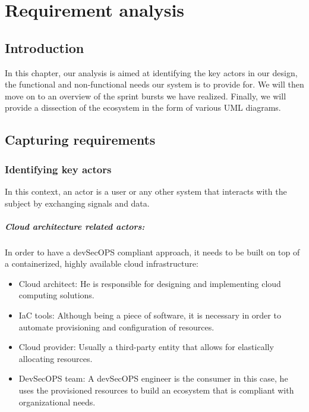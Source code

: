 \graphicspath{{./assets/}}
\setcounter{mtc}{2}
\chapter{Requirement analysis  }
\minitoc
\newpage

\section*{Introduction}
In this chapter, our analysis is aimed at identifying the key actors in our design, the functional and non-functional needs our system is to provide for. We will then move on to an overview of the sprint bursts we have realized. Finally, we will provide a dissection of the ecosystem in the form of various UML diagrams. 

\section{Capturing requirements}
\subsection{Identifying key actors}
In this context, an actor is a user or any other system that interacts with the subject by exchanging signals and data.

\paragraph{Cloud architecture related actors:}
In order to have a devSecOPS compliant approach, it needs to be built on top of a containerized, highly available cloud infrastructure:
\begin{itemize}[label={--}]
\item Cloud architect: He is responsible for designing and implementing cloud computing solutions.
\item IaC tools: Although being a piece of software, it is necessary in order to automate provisioning and configuration of resources.
\item Cloud provider: Usually a third-party entity that allows for elastically allocating resources.
\item DevSecOPS team: A devSecOPS engineer is the consumer in this case, he uses the provisioned resources to build an ecosystem that is compliant with organizational needs.
\end{itemize}

